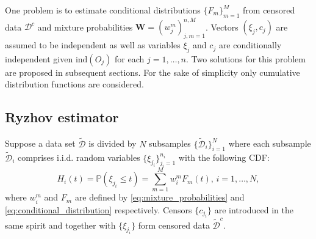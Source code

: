\documentclass[12pt,reqno,a4paper,oneside,draft]{article}
\theoremstyle{plain}
\theoremstyle{definition}
\theoremstyle{remark}
\begin{document}
One problem is to estimate conditional distributions $\{F_m\}_{m=1}^M$ from censored data $\mathcal D^c$ and mixture probabilities $\mathbf W = (w_j^m)_{j,m=1}^{n,M}$. Vectors $(\xi _j, c _j)$ are assumed to be independent as well as variables $\xi _j$ and $c_j$ are conditionally independent given $\mathrm{ind}(O_j)$ for each $j=1,\ldots ,n$. Two solutions for this problem are proposed in subsequent sections. For the sake of simplicity only cumulative distribution functions are considered.

\subsection{Ryzhov estimator}
Suppose a data set $\tilde {\mathcal D}$ is divided by $N$ subsamples $\{\tilde{\mathcal D} _i\}_{i=1}^N$ where each subsample $\tilde{\mathcal D}_i$ comprises i.i.d. random variables $\{\xi _{j_i} \}_{j_i=1}^{n_i}$ with the following CDF:
\begin{equation}
\label{eq:Ryzhov_mixture_distribution}
H_i(t) = \mathbb P(\xi _{j_i} \leq t) = \sum _{m=1}^M w_i^mF_m(t), \, i = 1,\ldots, N,
\end{equation}
where $w_i^m$ and $F_m$ are defined by \eqref{eq:mixture_probabilities} and \eqref{eq:conditional_distribution} respectively. Censors $\{c_{j_i} \}$ are introduced in the same spirit and together with $\{\xi _{j_i}\}$ form censored data $\tilde{\mathcal D}^c$.
\end{document}
